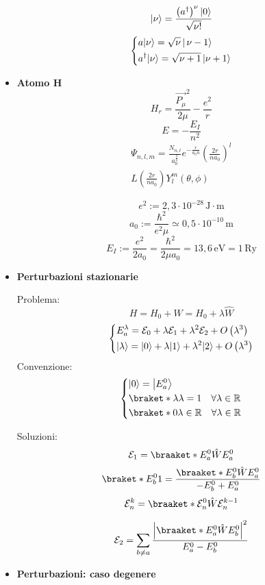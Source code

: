 \documentclass{article}
\DeclarePairedDelimiter\ket{\lvert}{\rangle}
\begin{document}
\begin{small}
\begin{multicols*}{3}
\begin{itemize}[leftmargin=*]
		\[\ket*{\nu } = \frac{\left(a^\dag\right)^\nu \ket*{0}}{\sqrt{\nu !}}\]
		\[
			\left\{\begin{aligned}
				&a\ket*{\nu } = \sqrt{\nu}\,\ket*{\,\mathrm{\nu -1}} \\
				& a^\dag\ket*{\nu } = \sqrt{\nu +1}\,\ket*{\nu +1}\\
			\end{aligned}\right.
		\]
	\item \textbf{Atomo H}
		\[H_r = \frac{\vec{P_\mu }^2}{2\mu } - \frac{e^2}{r}\]
		\[E=-\frac{E_I}{n^2}\]
		\begin{align*}\Psi _{n,l,m} = \frac{N_{n,l}}{a_0^{\frac{3}{2}}} e^{-\frac{r}{a_0n}} \left(\frac{2r}{na_0}\right)^l\\ L\left(\frac{2r}{na_0}\right) Y_l^m(\theta ,\phi )\end{align*}


		\[e^2 := 2,3\cdot 10^{-28}\,\mathrm{J\cdot m}\]
		\[a_0 := \frac{\hbar ^2}{e^2\mu } \simeq 0,5\cdot 10^{-10}\,\mathrm{m}\]
		\[E_I := \frac{e^2}{2a_0} = \frac{\hbar ^2}{2\mu a_0} = 13,6\,\mathrm{eV} = 1\,\mathrm{Ry}\]
	\item \textbf{Perturbazioni stazionarie}

		Problema:
		\[H= H_0+W = H_0+\lambda \hat{W}\]
		\[
			\left\{\begin{aligned}
				&E_a^\lambda = \mathcal{E}_0 + \lambda \mathcal{E}_1 + \lambda ^2\mathcal{E}_2 + O\left(\lambda ^3\right)\\
				&\ket*{\lambda } = \ket*{0} + \lambda \ket*{1} + \lambda ^2\ket*{2} + O\left(\lambda ^3\right)\\
			\end{aligned}\right.
		\]
		Convenzione:
		\[
			\left\{\begin{aligned}
				&\ket*{0}=\ket*{E_a^0}\\
				&\braket*{\lambda }{\lambda } = 1 \ \ \ \forall \lambda\in \mathbb{R} \\
				&\braket*{0}{\lambda }\in \mathbb{R}\ \ \ \forall \lambda \in \mathbb{R}
			\end{aligned}\right.
		\]

		Soluzioni:
		\[\mathcal{E}_1 = \braaket*{E_a^0}{\hat{W}}{E_a^0}\]
		\[\braket*{E_b^0}{1} = \frac{\braaket*{E_b^0}{\hat{W}}{E_a^0}}{-E_b^0 + E_a^0}\]
		\[\mathcal{E}_n^k = \braaket*{\mathcal{E}_n^0}{\hat{W}}{\mathcal{E}_n^{k-1}}\]

		\[\mathcal{E}_2 = \sum_{b\neq a} \frac{\left|\braaket*{E_a^0}{\hat{W}}{E_b^0}\right|^2}{E_a^0 - E_b^0}\]
	\item \textbf{Perturbazioni: caso degenere}


\end{itemize}
\end{multicols*}
\end{small}
\end{document}
